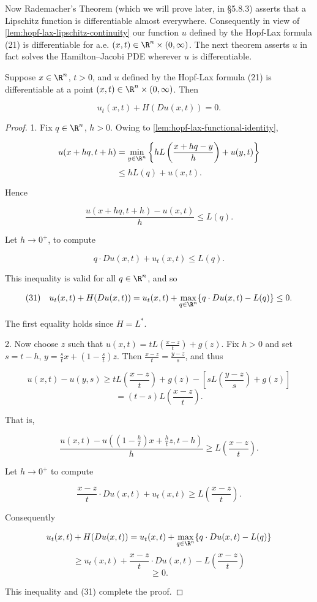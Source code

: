 Now Rademacher's Theorem (which we will prove later, in \S5.8.3) asserts that a Lipschitz function is differentiable almost everywhere. Consequently in view of \cref{lem:hopf-lax-lipschitz-continuity} our function $u$ defined by the Hopf-Lax formula (21) is differentiable for a.e. $(x,t) \in \R^n \times (0,\infty)$. The next theorem asserts $u$ in fact solves the Hamilton--Jacobi PDE wherever $u$ is differentiable.

\begin{theorem}
\label{thm:hopf-lax-solves-hj-equation}
Suppose $x \in \R^n$, $t > 0$, and $u$ defined by the Hopf-Lax formula (21) is differentiable at a point $(x,t) \in \R^n \times (0,\infty)$. Then

$$u_t(x,t) + H(Du(x,t)) = 0.$$
\end{theorem}

\begin{proof}
1. Fix $q \in \R^n$, $h > 0$. Owing to \cref{lem:hopf-lax-functional-identity},

$$u(x + hq, t + h) = \min_{y \in \R^n} \left\{ hL\left(\frac{x + hq - y}{h}\right) + u(y,t) \right\}$$
$$\leq hL(q) + u(x,t).$$

Hence

$$\frac{u(x + hq, t + h) - u(x,t)}{h} \leq L(q).$$

Let $h \to 0^+$, to compute

$$q \cdot Du(x,t) + u_t(x,t) \leq L(q).$$

This inequality is valid for all $q \in \R^n$, and so

$$(31) \quad u_t(x,t) + H(Du(x,t)) = u_t(x,t) + \max_{q \in \R^n} \{q \cdot Du(x,t) - L(q)\} \leq 0.$$

The first equality holds since $H = L^*$.

2. Now choose $z$ such that $u(x,t) = tL\left(\frac{x-z}{t}\right) + g(z)$. Fix $h > 0$ and set $s = t - h$, $y = \frac{s}{t}x + \left(1 - \frac{s}{t}\right)z$. Then $\frac{x-z}{t} = \frac{y-z}{s}$, and thus

$$u(x,t) - u(y,s) \geq tL\left(\frac{x-z}{t}\right) + g(z) - \left[sL\left(\frac{y-z}{s}\right) + g(z)\right]$$
$$= (t-s)L\left(\frac{x-z}{t}\right).$$

That is,

$$\frac{u(x,t) - u\left(\left(1-\frac{h}{t}\right)x + \frac{h}{t}z, t-h\right)}{h} \geq L\left(\frac{x-z}{t}\right).$$

Let $h \to 0^+$ to compute

$$\frac{x - z}{t} \cdot Du(x,t) + u_t(x,t) \geq L\left(\frac{x-z}{t}\right).$$

Consequently

$$u_t(x,t) + H(Du(x,t)) = u_t(x,t) + \max_{q \in \R^n} \{q \cdot Du(x,t) - L(q)\}$$
$$\geq u_t(x,t) + \frac{x - z}{t} \cdot Du(x,t) - L\left(\frac{x-z}{t}\right)$$
$$\geq 0.$$

This inequality and (31) complete the proof.
\end{proof}

